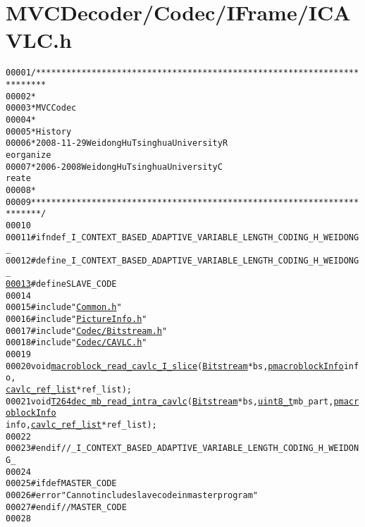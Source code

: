 \hypertarget{_i_c_a_v_l_c_8h_source}{
\section{MVCDecoder/Codec/IFrame/ICAVLC.h}
}


\begin{footnotesize}\begin{alltt}
00001 \textcolor{comment}{/************************************************************************}
00002 \textcolor{comment}{ *}
00003 \textcolor{comment}{ * MVC Codec}
00004 \textcolor{comment}{ * }
00005 \textcolor{comment}{ * History}
00006 \textcolor{comment}{ * 2008-11-29           Weidong Hu              Tsinghua University             R
      eorganize}
00007 \textcolor{comment}{ * 2006-2008            Weidong Hu              Tsinghua University             C
      reate}
00008 \textcolor{comment}{ * }
00009 \textcolor{comment}{ ************************************************************************/}
00010 
00011 \textcolor{preprocessor}{#ifndef \_I\_CONTEXT\_BASED\_ADAPTIVE\_VARIABLE\_LENGTH\_CODING\_H\_WEIDONG\_}
00012 \textcolor{preprocessor}{}\textcolor{preprocessor}{#define \_I\_CONTEXT\_BASED\_ADAPTIVE\_VARIABLE\_LENGTH\_CODING\_H\_WEIDONG\_}
\hypertarget{_i_c_a_v_l_c_8h_source_l00013}{}\hyperlink{_i_c_a_v_l_c_8h_a995f6a4907273b8d56b6543ab1a57d17}{00013} \textcolor{preprocessor}{}\textcolor{preprocessor}{#define SLAVE\_CODE}
00014 \textcolor{preprocessor}{}
00015 \textcolor{preprocessor}{#include "\hyperlink{_common_8h}{Common.h}"}
00016 \textcolor{preprocessor}{#include "\hyperlink{_picture_info_8h}{PictureInfo.h}"}
00017 \textcolor{preprocessor}{#include "\hyperlink{_bitstream_8h}{Codec/Bitstream.h}"}
00018 \textcolor{preprocessor}{#include "\hyperlink{_c_a_v_l_c_8h}{Codec/CAVLC.h}"}
00019 
00020 \textcolor{keywordtype}{void} \hyperlink{_i_c_a_v_l_c_8cpp_a5ca95f08673d3dcfd97990a11501c6da}{macroblock_read_cavlc_I_slice}(\hyperlink{struct_bitstream}{Bitstream} *bs, \hyperlink{structmacroblock_info}{pmacroblockInfo} info, 
      \hyperlink{structtag__cavlc__ref__list}{cavlc_ref_list} *ref\_list);
00021 \textcolor{keywordtype}{void} \hyperlink{_i_c_a_v_l_c_8cpp_aacaa2d123678a0deb8a0c2a5ee6e53b1}{T264dec_mb_read_intra_cavlc}(\hyperlink{struct_bitstream}{Bitstream} *bs, \hyperlink{_types_8h_a363e4d606232036a6b89060813c45489}{uint8_t} mb\_part, \hyperlink{structmacroblock_info}{pmacroblockInfo} 
      info, \hyperlink{structtag__cavlc__ref__list}{cavlc_ref_list} *ref\_list);
00022 
00023 \textcolor{preprocessor}{#endif //\_I\_CONTEXT\_BASED\_ADAPTIVE\_VARIABLE\_LENGTH\_CODING\_H\_WEIDONG\_}
00024 \textcolor{preprocessor}{}
00025 \textcolor{preprocessor}{#ifdef MASTER\_CODE}
00026 \textcolor{preprocessor}{}\textcolor{preprocessor}{#error "Can not include slave code in master program"}
00027 \textcolor{preprocessor}{}\textcolor{preprocessor}{#endif // MASTER\_CODE}
00028 \textcolor{preprocessor}{}
\end{alltt}\end{footnotesize}
